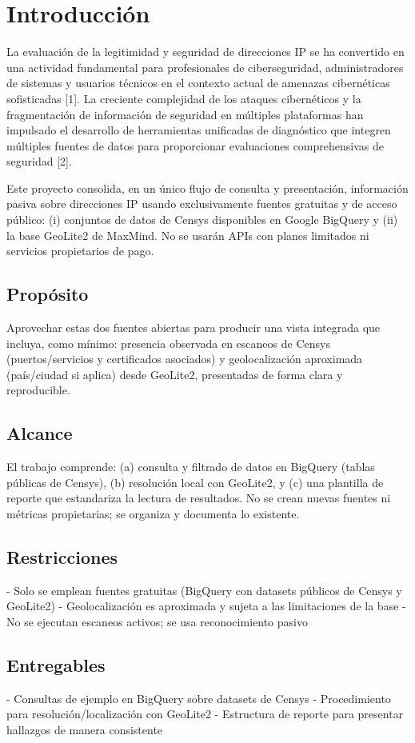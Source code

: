 \section{Introducción}

La evaluación de la legitimidad y seguridad de direcciones IP se ha convertido en una actividad fundamental para profesionales de ciberseguridad, administradores de sistemas y usuarios técnicos en el contexto actual de amenazas cibernéticas sofisticadas [1]. La creciente complejidad de los ataques cibernéticos y la fragmentación de información de seguridad en múltiples plataformas han impulsado el desarrollo de herramientas unificadas de diagnóstico que integren múltiples fuentes de datos para proporcionar evaluaciones comprehensivas de seguridad [2].

Este proyecto consolida, en un único flujo de consulta y presentación, información pasiva sobre direcciones IP usando exclusivamente fuentes gratuitas y de acceso público: (i) conjuntos de datos de Censys disponibles en Google BigQuery y (ii) la base GeoLite2 de MaxMind. No se usarán APIs con planes limitados ni servicios propietarios de pago.

\subsection{Propósito}

Aprovechar estas dos fuentes abiertas para producir una vista integrada que incluya, como mínimo: presencia observada en escaneos de Censys (puertos/servicios y certificados asociados) y geolocalización aproximada (país/ciudad si aplica) desde GeoLite2, presentadas de forma clara y reproducible.

\subsection{Alcance}

El trabajo comprende: (a) consulta y filtrado de datos en BigQuery (tablas públicas de Censys), (b) resolución local con GeoLite2, y (c) una plantilla de reporte que estandariza la lectura de resultados. No se crean nuevas fuentes ni métricas propietarias; se organiza y documenta lo existente.

\subsection{Restricciones}

- Solo se emplean fuentes gratuitas (BigQuery con datasets públicos de Censys y GeoLite2)
- Geolocalización es aproximada y sujeta a las limitaciones de la base
- No se ejecutan escaneos activos; se usa reconocimiento pasivo

\subsection{Entregables}

- Consultas de ejemplo en BigQuery sobre datasets de Censys
- Procedimiento para resolución/localización con GeoLite2
- Estructura de reporte para presentar hallazgos de manera consistente

